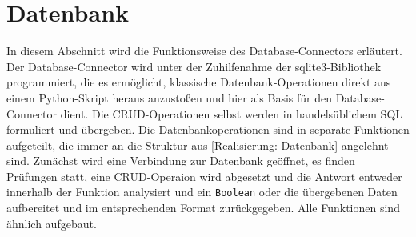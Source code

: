     \section{Datenbank} \label{Implementierung: Datenbank}
        In diesem Abschnitt wird die Funktionsweise des Database-Connectors erläutert.  
        Der Database-Connector wird unter der Zuhilfenahme der sqlite3-Bibliothek programmiert, die es ermöglicht, klassische Datenbank-Operationen direkt aus einem Python-Skript heraus anzustoßen und hier als Basis für den Database-Connector dient. Die CRUD-Operationen selbst werden in handelsüblichem SQL formuliert und übergeben. Die Datenbankoperationen sind in separate Funktionen aufgeteilt, die immer an die Struktur aus \ref*{Realisierung: Datenbank} angelehnt sind. Zunächst wird eine Verbindung zur Datenbank geöffnet, es finden Prüfungen statt, eine CRUD-Operaion wird abgesetzt und die Antwort entweder innerhalb der Funktion analysiert und ein \verb|Boolean| oder die übergebenen Daten aufbereitet und im entsprechenden Format zurückgegeben. Alle Funktionen sind ähnlich aufgebaut.
                
